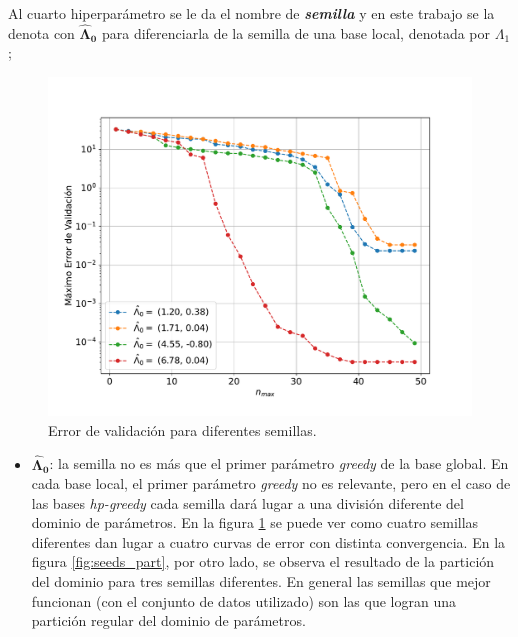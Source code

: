 Al cuarto hiperparámetro se le da el nombre de \textit{\textbf{semilla}} y en este trabajo se la denota con $\bm{\hat{\Lambda}_0}$ para diferenciarla de la semilla de una base local, denotada por $\Lambda_1$;

\begin{figure}[h!]
\centering
\includegraphics[width=.8\columnwidth ,trim={1.1cm, 1.1cm, 1.2cm, 1.2cm}]{figs/Semillas_v_nmax_2D.pdf}
\caption{Error de validación para diferentes semillas.}
\label{fig:seeds0}
\end{figure}

\begin{itemize}
\item $\bm{\hat{\Lambda}_0}$: la semilla no es más que el primer parámetro \textit{greedy} de la base global. En cada base local, el primer parámetro \textit{greedy} no es relevante, pero en el caso de las bases \textit{hp-greedy} cada semilla dará lugar a una división diferente del dominio de parámetros. En la figura \ref{fig:seeds0} se puede ver como cuatro semillas diferentes dan lugar a cuatro curvas de error con distinta convergencia. En la figura \ref{fig:seeds_part}, por otro lado, se observa el resultado de la partición del dominio para tres semillas diferentes. En general las semillas que mejor funcionan (con el conjunto de datos utilizado) son las que logran una partición regular del dominio de parámetros.
\end{itemize}

